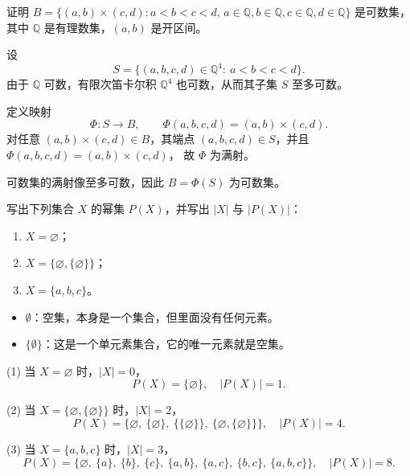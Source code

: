 \begin{homework}[1.16]
证明 $B=\{(a,b)\times (c,d): a<b<c<d,\, a\in \mathbb{Q}, b\in \mathbb{Q}, c\in \mathbb{Q}, d\in \mathbb{Q}\}$ 是可数集，其中 $\mathbb{Q}$ 是有理数集，$(a,b)$ 是开区间。
\end{homework}
\begin{solution}
设
\[
S=\{(a,b,c,d)\in\mathbb Q^4:\ a<b<c<d\}.
\]
由于 $\mathbb Q$ 可数，有限次笛卡尔积 $\mathbb Q^4$ 也可数，从而其子集 $S$ 至多可数。

定义映射
\[
\Phi:S\longrightarrow B,\qquad \Phi(a,b,c,d)=(a,b)\times(c,d).
\]
对任意 $(a,b)\times(c,d)\in B$，其端点 $(a,b,c,d)\in S$，并且
\(
\Phi(a,b,c,d)=(a,b)\times(c,d)
\)，
故 $\Phi$ 为满射。

可数集的满射像至多可数，因此 $B=\Phi(S)$ 为可数集。
\end{solution}
\begin{homework}[1.17]
写出下列集合 $X$ 的幂集 $P(X)$，并写出 $|X|$ 与 $|P(X)|$：
\begin{enumerate}[(1)]
  \item $X = \varnothing$；
  \item $X = \{\varnothing, \{\varnothing\}\}$；
  \item $X = \{a,b,c\}$。
\end{enumerate}
\end{homework}

\begin{solution}
\begin{itemize}
  \item $\emptyset$：空集，本身是一个集合，但里面没有任何元素。
  \item $\{\emptyset\}$：这是一个单元素集合，它的唯一元素就是空集。
\end{itemize}(1) 当 $X = \varnothing$ 时，$|X| = 0$，  
\[
P(X) = \{\varnothing\}, \quad |P(X)| = 1.
\]

(2) 当 $X = \{\varnothing, \{\varnothing\}\}$ 时，$|X| = 2$，  
\[
P(X) = \big\{ \varnothing,\ \{\varnothing\},\ \{\{\varnothing\}\},\ \{\varnothing, \{\varnothing\}\} \big\}, 
\quad |P(X)| = 4.
\]

(3) 当 $X = \{a,b,c\}$ 时，$|X| = 3$，  
\[
P(X) = \big\{ \varnothing,\ \{a\},\ \{b\},\ \{c\},\ \{a,b\},\ \{a,c\},\ \{b,c\},\ \{a,b,c\} \big\}, 
\quad |P(X)| = 8.
\]
\end{solution}

